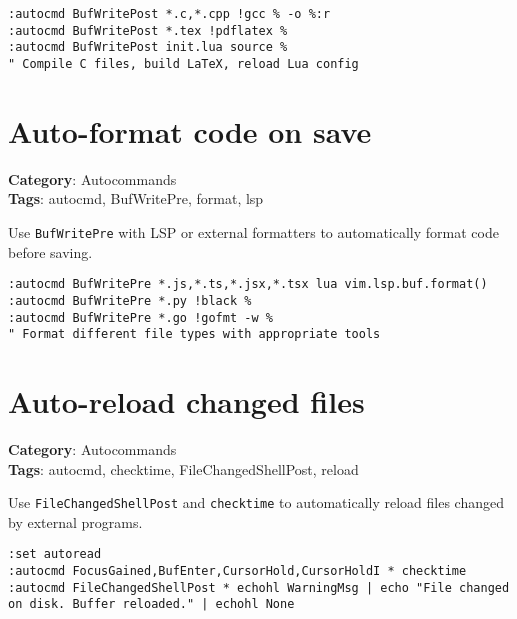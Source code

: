 \begin{Exa*}{}
\begin{Verbatim}[fontsize=\footnotesize, breaklines, breakanywhere]
:autocmd BufWritePost *.c,*.cpp !gcc % -o %:r
:autocmd BufWritePost *.tex !pdflatex %
:autocmd BufWritePost init.lua source %
" Compile C files, build LaTeX, reload Lua config
\end{Verbatim}
\end{Exa*}

\section{Auto-format code on save}

\textbf{Category}: Autocommands\\ \textbf{Tags}: autocmd, BufWritePre, format, lsp
\vspace{0.5cm}

Use {\footnotesize \Verb§BufWritePre§} with LSP or external formatters to automatically format code before saving.

\begin{Exa*}{}
\begin{Verbatim}[fontsize=\footnotesize, breaklines, breakanywhere]
:autocmd BufWritePre *.js,*.ts,*.jsx,*.tsx lua vim.lsp.buf.format()
:autocmd BufWritePre *.py !black %
:autocmd BufWritePre *.go !gofmt -w %
" Format different file types with appropriate tools
\end{Verbatim}
\end{Exa*}

\section{Auto-reload changed files}

\textbf{Category}: Autocommands\\ \textbf{Tags}: autocmd, checktime, FileChangedShellPost, reload
\vspace{0.5cm}

Use {\footnotesize \Verb§FileChangedShellPost§} and {\footnotesize \Verb§checktime§} to automatically reload files changed by external programs.

\begin{Exa*}{}
\begin{Verbatim}[fontsize=\footnotesize, breaklines, breakanywhere]
:set autoread
:autocmd FocusGained,BufEnter,CursorHold,CursorHoldI * checktime
:autocmd FileChangedShellPost * echohl WarningMsg | echo "File changed on disk. Buffer reloaded." | echohl None
\end{Verbatim}
\end{Exa*}

